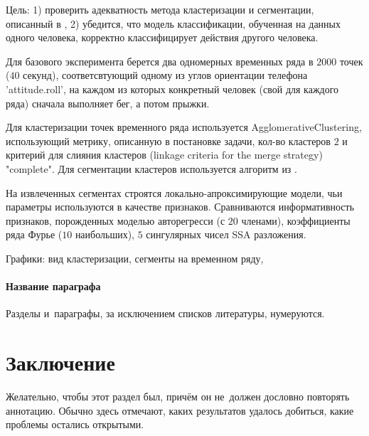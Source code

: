 \documentclass[12pt, twoside]{article}
\begin{document}
Цель: 1) проверить адекватность метода кластеризации и сегментации, описанный в \cite{Grabovoy20}, 2) убедится, что модель классификации, обученная на данных одного человека, корректно классифицирует действия другого человека.

Для базового эксперимента берется два одномерных временных ряда в $2000$ точек ($40$ секунд), соответсвтующий одному из углов ориентации телефона 'attitude.roll', на каждом из которых конкретный человек (свой для каждого ряда) сначала выполняет бег, а потом прыжки.

Для кластеризации точек временного ряда используется AgglomerativeClustering, использующий метрику, описанную в постановке задачи, кол-во кластеров $2$ и критерий для слияния кластеров (linkage criteria for the merge strategy) "complete". Для сегментации кластеров используется алгоритм из \cite{Motrenko16}.

На извлеченных сегментах строятся локально-апроксимирующие модели, чьи параметры используются в качестве признаков. Сравниваются информативность признаков, порожденных моделью авторегресси (с $20$ членами), коэффициенты ряда Фурье ($10$ наибольших), $5$ сингулярных чисел SSA разложения. 

Графики: вид кластеризации, сегменты на временном ряду,



\paragraph{Название параграфа}
Разделы и~параграфы, за исключением списков литературы, нумеруются.

\section{Заключение}
Желательно, чтобы этот раздел был, причём он не~должен дословно повторять аннотацию.
Обычно здесь отмечают, каких результатов удалось добиться, какие проблемы остались открытыми.

\begin{thebibliography}{99}
	
 	
\end{thebibliography}
\end{document}
